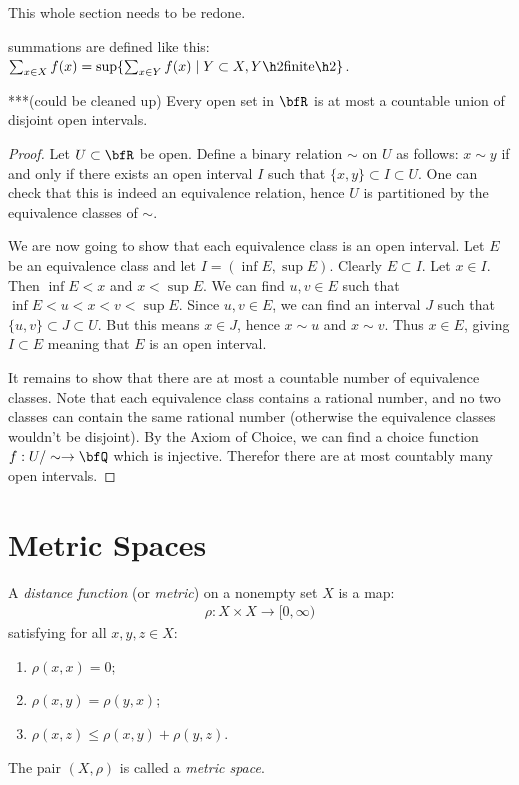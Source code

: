     This whole section needs to be redone.

    summations are defined like this: $\sum_{x \in X}f(x) = \sup \{\sum_{x \in Y}f(x) \mid Y \subset X, Y \h2\text{finite}\h2\}$.

    \begin{proposition}***(could be cleaned up)
        Every open set in $\bfR$ is at most a countable union of disjoint open intervals.
    \end{proposition}
        \begin{proof}
        Let $U \subset \bfR$ be open. Define a binary relation $\sim$ on $U$ as follows: $x \sim y$ if and only if there exists an open interval $I$ such that $\{x,y\} \subset I \subset U$. One can check that this is indeed an equivalence relation, hence $U$ is partitioned by the equivalence classes of $\sim$.
        
        We are now going to show that each equivalence class is an open interval. Let $E$ be an equivalence class and let $I = (\inf E, \sup E)$. Clearly $E \subset I$. Let $x \in I$. Then $\inf E < x$ and $x < \sup E$. We can find $u,v \in E$ such that $\inf E < u < x < v < \sup E$. Since $u,v \in E$, we can find an interval $J$ such that $\{u,v\} \subset J \subset U$. But this means $x \in J$, hence $x \sim u$ and $x \sim v$. Thus $x \in E$, giving $I \subset E$ meaning that $E$ is an open interval.

        It remains to show that there are at most a countable number of equivalence classes. Note that each equivalence class contains a rational number, and no two classes can contain the same rational number (otherwise the equivalence classes wouldn't be disjoint). By the Axiom of Choice, we can find a choice function $f:U/\sim \rightarrow \bfQ$ which is injective. Therefor there are at most countably many open intervals.
        \end{proof}

\section{Metric Spaces}
    \begin{definition}
        A \textit{distance function} (or \textit{metric}) on a nonempty set $X$ is a map:
            \begin{equation*}
            \begin{split}
                \rho:X \times X \rightarrow [0,\infty)
            \end{split}
            \end{equation*}
        satisfying for all $x,y,z \in X$:
            \begin{enumerate}[label = (\arabic*),itemsep=1pt,topsep=3pt]
                \item $\rho(x,x) = 0$;
                \item $\rho(x,y) = \rho(y,x)$;
                \item $\rho(x,z) \leq \rho(x,y) + \rho(y,z)$.
            \end{enumerate}
        The pair $(X,\rho)$ is called a \textit{metric space}.
    \end{definition}

